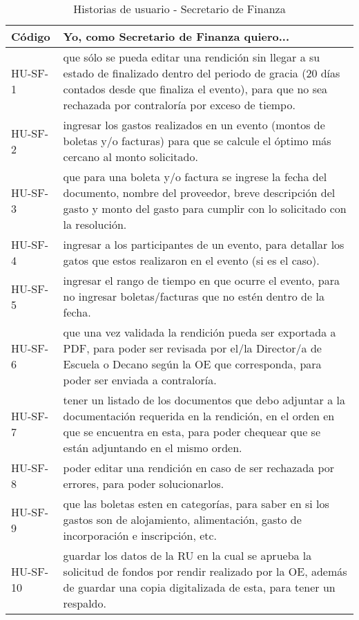 \begin{table}[htbp]
    \centering
    \caption{Historias de usuario - Secretario de Finanza}
    \label{tabla:Historias_Ususario_Secretario_Finanza}
    \begin{tabular}{| p{2.6cm}| p{12.2cm} |}
    \hline
    Código & Yo, como Secretario de Finanza quiero... \\
    \hline \hline
    
    HU-SF-1 & que sólo se pueda editar una rendición sin llegar a su estado de finalizado dentro del periodo de gracia (20 días contados desde que finaliza el evento), para que no sea rechazada por contraloría por exceso de tiempo. \\ \hline

    HU-SF-2 & ingresar los gastos realizados en un evento (montos de boletas y/o facturas) para que se calcule el óptimo más cercano al monto solicitado. \\ \hline

    HU-SF-3 & que para una boleta y/o factura se ingrese la fecha del documento, nombre del proveedor, breve descripción del gasto y monto del gasto para cumplir con lo solicitado con la resolución. \\ \hline

    HU-SF-4 & ingresar a los participantes de un evento, para detallar los gatos que estos realizaron en el evento (si es el caso). \\ \hline

    HU-SF-5 & ingresar el rango de tiempo en que ocurre el evento, para no ingresar boletas/facturas que no estén dentro de la fecha. \\ \hline

    HU-SF-6 & que una vez validada la rendición pueda ser exportada a PDF, para poder ser revisada por el/la Director/a de Escuela o Decano según la OE que corresponda, para poder ser enviada a contraloría. \\ \hline

    HU-SF-7 & tener un listado de los documentos que debo adjuntar a la documentación requerida en la rendición, en el orden en que se encuentra en esta, para poder chequear que se están adjuntando en el mismo orden. \\ \hline

    HU-SF-8 & poder editar una rendición en caso de ser rechazada por errores, para poder solucionarlos. \\ \hline

    HU-SF-9 & que las boletas esten en categorías, para saber en si los gastos son de alojamiento, alimentación, gasto de incorporación e inscripción, etc. \\ \hline

    HU-SF-10 & guardar los datos de la RU en la cual se aprueba la solicitud de fondos por rendir realizado por la OE, además de guardar una copia digitalizada de esta, para tener un respaldo.\\ \hline
    \end{tabular}
\end{table}

